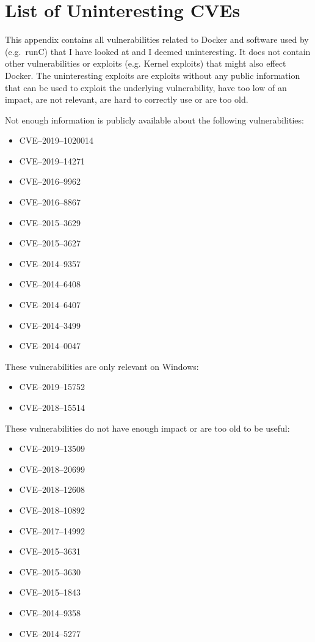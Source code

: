\chapter{List of Uninteresting CVEs}\label{appendix:CVE-List}
This appendix contains all vulnerabilities related to Docker and software used by (e.g.\ runC) that I have looked at and I deemed uninteresting. It does not contain other vulnerabilities or exploits (e.g. Kernel exploits) that might also effect Docker. The uninteresting exploits are exploits without any public information that can be used to exploit the underlying vulnerability, have too low of an impact, are not relevant, are hard to correctly use or are too old.

\medskip

Not enough information is publicly available about the following vulnerabilities:
\begin{multicols}{2}
    \begin{itemize}
        \item CVE--2019--1020014
        \item CVE--2019--14271
        \item CVE--2016--9962
        \item CVE--2016--8867
        \item CVE--2015--3629
        \item CVE--2015--3627
        \item CVE--2014--9357
        \item CVE--2014--6408
        \item CVE--2014--6407
        \item CVE--2014--3499
        \item CVE--2014--0047
    \end{itemize}
\end{multicols}

\medskip

These vulnerabilities are only relevant on Windows:
\begin{itemize}
    \item CVE--2019--15752
    \item CVE--2018--15514
\end{itemize}

\medskip

These vulnerabilities do not have enough impact or are too old to be useful:
\begin{itemize}
    \item CVE--2019--13509
    \item CVE--2018--20699
    \item CVE--2018--12608
    \item CVE--2018--10892
    \item CVE--2017--14992
    \item CVE--2015--3631
    \item CVE--2015--3630
    \item CVE--2015--1843
    \item CVE--2014--9358
    \item CVE--2014--5277
\end{itemize}
